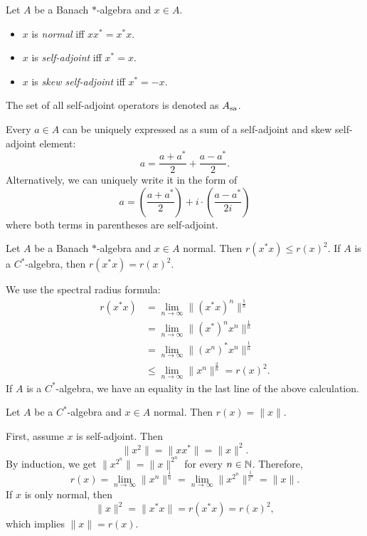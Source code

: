 \begin{definition}
  Let $A$ be a Banach $*$-algebra and $x \in A$.
  \begin{itemize}
    \item $x$ is \emph{normal} iff $x x^* = x^* x$.
    \item $x$ is \emph{self-adjoint} iff $x^* = x$.
    \item $x$ is \emph{skew self-adjoint} iff $x^* = - x$.
  \end{itemize}
  The set of all self-adjoint operators is denoted as $A_{\operatorname{sa}}$.
\end{definition}

\begin{remark}
  Every $a \in A$ can be uniquely expressed as a sum of a self-adjoint and skew self-adjoint element:
  $$a = \frac{a + a^*}{2} + \frac{a - a^*}{2}.$$
  Alternatively, we can uniquely write it in the form of
  $$a = \left(\frac{a + a^*}{2} \right) + i \cdot \left(\frac{a - a^*}{2i}\right)$$
  where both terms in parentheses are self-adjoint.
\end{remark}

\begin{corollary}
  Let $A$ be a Banach $*$-algebra and $x \in A$ normal.
  Then $r(x^* x) \leq r(x)^2$. If $A$ is a $C^*$-algebra, then $r(x^* x) = r(x)^2$.
\end{corollary}

\begin{myproof}
  We use the spectral radius formula:
  \begin{align*}
    r(x^* x) &= \lim_{n \to \infty} \| (x^* x)^n \|^{\frac{1}{n}}\\
    &= \lim_{n \to \infty} \| (x^*)^n x^n\|^{\frac{1}{n}}\\
    &= \lim_{n \to \infty} \| (x^n)^* x^n\|^{\frac{1}{n}}\\
    &\leq \lim_{n \to \infty} \| x^n\|^{\frac{2}{n}} = r(x)^2.
  \end{align*} 
  If $A$ is a $C^*$-algebra, we have an equality in the last line of the above calculation.
\end{myproof}

\begin{proposition}
  Let $A$ be a $C^*$-algebra and $x \in A$ normal. Then $r(x) = \|x\|$.
\end{proposition}

\begin{myproof}
  First, assume $x$ is self-adjoint. Then 
  $$\|x^2\| = \| xx^*\| = \|x\|^2.$$
  By induction, we get 
  $\|x^{2^n}\| = \|x\|^{2^n}$ for every $n \in \mathbb {N}$.
  Therefore, 
  $$r(x) = \lim_{n \to \infty} \| x^n\|^\frac{1}{n} = \lim_{n \to \infty} \| x^{2^n} \|^{\frac{1}{2^n}} = \| x\|.$$
  If $x$ is only normal, then $$\| x\|^2 = \| x^*x\| = r(x^* x) = r(x)^2,$$
  which implies $\|x\| = r(x)$.
\end{myproof}

